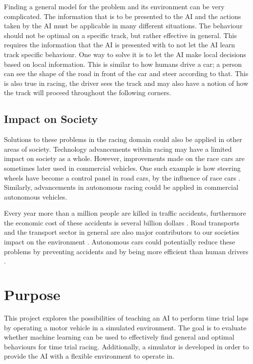 Finding a general model for the problem and its environment can be very complicated. The information that is to be presented to the AI and the actions taken by the AI must be applicable in many different situations. The behaviour should not be optimal on a specific track, but rather effective in general. This requires the information that the AI is presented with to not let the AI learn track specific behaviour. One way to solve it is to let the AI make local decisions based on local information. This is similar to how humans drive a car; a person can see the shape of the road in front of the car and steer according to that. This is also true in racing, the driver sees the track and may also have a notion of how the track will proceed throughout the following corners.

\subsection{Impact on Society}

Solutions to these problems in the racing domain could also be applied in other areas of society. Technology advancements within racing may have a limited impact on society as a whole. However, improvements made on the race cars are sometimes later used in commercial vehicles. One such example is how steering wheels have become a control panel in road cars, by the influence of race cars \cite{gkikas}. Similarly, advancements in autonomous racing could be applied in commercial autonomous vehicles. 

Every year more than a million people are killed in traffic accidents, furthermore the economic cost of these accidents is several billion dollars \cite{who:traffic}. Road transports and the transport sector in general are also major contributors to our societies impact on the environment \cite{fuglestvedt2008climate}. Autonomous cars could potentially reduce these problems by preventing accidents and by being more efficient than human drivers \cite{anderson}.


\section{Purpose}
\label{purpose}
This project explores the possibilities of teaching an AI to perform time trial laps by operating a motor vehicle in a simulated environment. The goal is to evaluate whether machine learning can be used to effectively find general and optimal behaviours for time trial racing. Additionally, a simulator is developed in order to provide the AI with a flexible environment to operate in.

